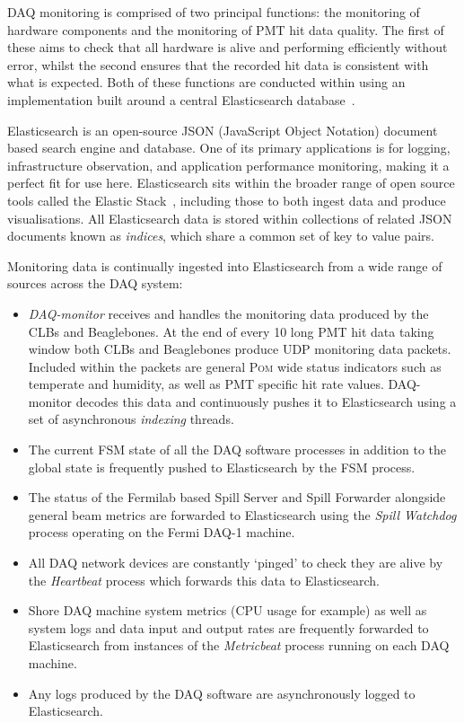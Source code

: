 \chipsfive DAQ monitoring is comprised of two principal functions: the monitoring of hardware
components and the monitoring of PMT hit data quality. The first of these aims to check that all
hardware is alive and performing efficiently without error, whilst the second ensures that the
recorded hit data is consistent with what is expected. Both of these functions are conducted
within \chipsfive using an implementation built around a central Elasticsearch
database~\cite{elasticsearch2020}.

Elasticsearch is an open-source JSON (JavaScript Object Notation) document based search engine and
database. One of its primary applications is for logging, infrastructure observation, and
application performance monitoring, making it a perfect fit for use here. Elasticsearch sits
within the broader range of open source tools called the Elastic Stack~\cite{elasticstack2020},
including those to both ingest data and produce visualisations. All Elasticsearch data is stored
within collections of related JSON documents known as \emph{indices}, which share a common set of
key to value pairs.

Monitoring data is continually ingested into Elasticsearch from a wide range of sources across the
\chipsfive DAQ system:
\begin{itemize}
    \item \emph{DAQ-monitor} receives and handles the monitoring data produced by the CLBs and
    Beaglebones. At the end of every \SI{10}{} long PMT hit data taking window both CLBs
    and Beaglebones produce UDP monitoring data packets. Included within the packets are general
    \textsc{Pom} wide status indicators such as temperate and humidity, as well as PMT specific
    hit rate values. DAQ-monitor decodes this data and continuously pushes it to Elasticsearch
    using a set of asynchronous \emph{indexing} threads.
    \item The current FSM state of all the DAQ software processes in addition to the global state
    is frequently pushed to Elasticsearch by the FSM process.
    \item The status of the Fermilab based Spill Server and Spill Forwarder alongside general
    \numi beam metrics are forwarded to Elasticsearch using the \emph{Spill Watchdog} process
    operating on the Fermi DAQ-1 machine.
    \item All DAQ network devices are constantly `pinged' to check they are alive by the
    \emph{Heartbeat} process which forwards this data to Elasticsearch.
    \item Shore DAQ machine system metrics (CPU usage for example) as well as system logs and data
    input and output rates are frequently forwarded to Elasticsearch from instances of the
    \emph{Metricbeat} process running on each DAQ machine.
    \item Any logs produced by the DAQ software are asynchronously logged to Elasticsearch.
\end{itemize}


